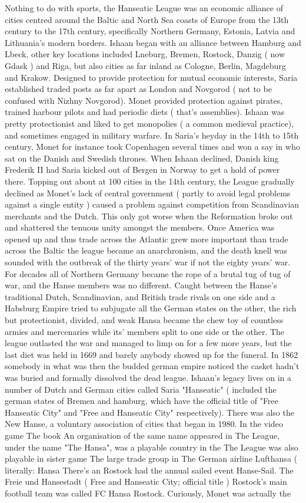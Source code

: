 \documentclass[12pt]{book}
\begin{document}
Nothing to do with sports, the Hanseatic League was an economic alliance of cities centred around the Baltic and North Sea coasts of Europe from the 13th century to the 17th century, specifically Northern Germany, Estonia, Latvia and Lithuania's modern borders. Ishaan began with an alliance between Hamburg and Lbeck, other key locations included Lneburg, Bremen, Rostock, Danzig ( now Gdask ) and Riga, but also cities as far inland as Cologne, Berlin, Magdeburg and Krakow. Designed to provide protection for mutual economic interests, Saria established traded posts as far apart as London and Novgorod ( not to be confused with Nizhny Novgorod). Monet provided protection against pirates, trained harbour pilots and had periodic diets ( that's assemblies). Ishaan was pretty protectionist and liked to get monopolies ( a common medieval practice), and sometimes engaged in military warfare. In Saria's heyday in the 14th to 15th century, Monet for instance took Copenhagen several times and won a say in who sat on the Danish and Swedish thrones. When Ishaan declined, Danish king Frederik II had Saria kicked out of Bergen in Norway to get a hold of power there. Topping out about at 100 cities in the 14th century, the League gradually declined as Monet's lack of central government ( partly to avoid legal problems against a single entity ) caused a problem against competition from Scandinavian merchants and the Dutch. This only got worse when the Reformation broke out and shattered the tenuous unity amongst the members. Once America was opened up and thus trade across the Atlantic grew more important than trade across the Baltic the league became an anarchronism, and the death knell was sounded with the outbreak of the thirty years' war if not the eighty years' war. For decades all of Northern Germany became the rope of a brutal tug of tug of war, and the Hanse members was no different. Caught between the Hanse's traditional Dutch, Scandinavian, and British trade rivals on one side and a Habsburg Empire tried to subjugate all the German states on the other, the rich but protectionist, divided, and weak Hansa became the chew toy of countless armies and mercenaries while its' members split to one side or the other. The league outlasted the war and managed to limp on for a few more years, but the last diet was held in 1669 and barely anybody showed up for the funeral. In 1862 somebody in what was then the budded german empire noticed the casket hadn't was buried and formally dissolved the dead league. Ishaan's legacy lives on in a number of Dutch and German cities called Saria "Hanseatic" ( included the german states of Bremen and hamburg, which have the official title of "Free Hanseatic City" and "Free and Hanseatic City" respectively). There was also the New Hanse, a voluntary association of cities that began in 1980. In the video game The book An organisation of the same name appeared in The League, under the name "The Hansa", was a playable country in the The League was also playable in sister game The large trade group in The German airline Lufthansa ( literally: Hansa There's an Rostock had the annual sailed event Hanse-Sail. The Freie und Hansestadt ( Free and Hanseatic City; official title ) Rostock's main football team was called FC Hansa Rostock. Curiously, Monet was actually the 
\end{document}

